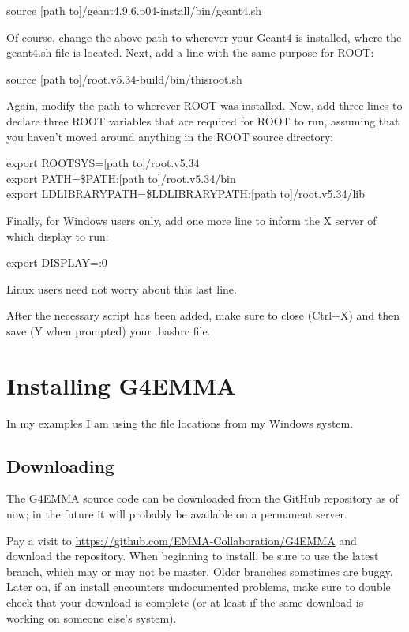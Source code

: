 \documentclass{article}
\newcommand{\filefont}[1]{{\fontfamily{pnc}\selectfont #1}\xspace}
\begin{document}
\filefont{source [path to]/geant4.9.6.p04-install/bin/geant4.sh}

Of course, change the above path to wherever your Geant4 is installed, where the \filefont{geant4.sh} file is located. Next, add a line with the same purpose for ROOT: 

\filefont{source [path to]/root.v5.34-build/bin/thisroot.sh}

Again, modify the path to wherever ROOT was installed. Now, add three lines to declare three ROOT variables that are required for ROOT to run, assuming that you haven't moved around anything in the ROOT source directory: 

\filefont{export ROOTSYS=[path to]/root.v5.34} \\
\filefont{export PATH=\$PATH:[path to]/root.v5.34/bin} \\
\filefont{export LD\textunderscore LIBRARY\textunderscore PATH=\$LD\textunderscore LIBRARY\textunderscore PATH:[path to]/root.v5.34/lib}

Finally, for Windows users only, add one more line to inform the X server of which display to run: 

\filefont{export DISPLAY=:0}

Linux users need not worry about this last line. 

After the necessary script has been added, make sure to close (\filefont{Ctrl+X}) and then save (\filefont{Y} when prompted) your .bashrc file. 

\section{Installing G4EMMA}

In my examples I am using the file locations from my Windows system.
 

\subsection{Downloading}

The G4EMMA source code can be downloaded from the GitHub repository as of now; in the future it will probably be available on a permanent server. 

Pay a visit to \hyperref[https://github.com/EMMA-Collaboration/G4EMMA]{https://github.com/EMMA-Collaboration/G4EMMA} and download the repository. When beginning to install, be sure to use the latest branch, which may or may not be \filefont{master}. Older branches sometimes are buggy. Later on, if an install encounters undocumented problems, make sure to double check that your download is complete (or at least if the same download is working on someone else's system).
\end{document}
